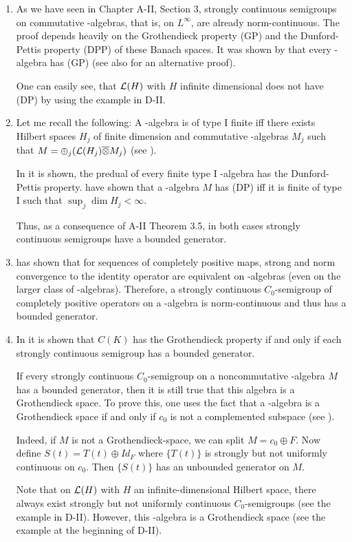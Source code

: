 \begin{enumerate}

\item 
As we have seen in Chapter A-II, Section 3, strongly continuous semigroups on commutative \WA-algebras, that is, on $L^{\infty}$, are already norm-continuous. 
The proof depends heavily on the Grothendieck property (GP) and the Dunford-Pettis property (DPP) of these Banach spaces. 
It was shown by  that every \WA-algebra has (GP) (see also  for an alternative proof).

One can easily see, that \eg $\mathcal{L}(H)$ with $H$ infinite dimensional does not have (DP) by using the example in D-II.

\item
Let me recall the following: A \WA-algebra is of type I finite iff there exists Hilbert spaces $H_{j}$ of finite dimension and commutative \WA-algebras $M_{j}$ such that 
$M = \oplus_{j} ( \mathcal{L}(H_{j}) \overline{\otimes} M_{j} ) $ (see ).

In  it is shown, the predual of every finite type I \WA-algebra has the Dunford-Pettis property.
 have shown that a \WA-algebra $M$ has (DP) iff it is finite of type I such that $ \sup_{j} \dim H_{j} < \infty$.

Thus, as a consequence of A-II Theorem 3.5, in both cases strongly continuous semigroups have a bounded generator.

\item
{} has shown that for sequences of completely positive maps, strong and norm convergence to the identity operator are equivalent on \WA-algebras (even on the larger class of \AW-algebras).
Therefore, a strongly continuous $C_{0}$-semigroup of completely positive operators on a \WA-algebra is norm-continuous and thus has a bounded generator.

\item 
In  it is shown that $C(K)$ has the Grothendieck property if and only if each strongly continuous semigroup has a bounded generator. 

If every strongly continuous $C_{0}$-semigroup on a noncommutative \CA-algebra $M$ has a bounded generator, then it is still true that this algebra is a Grothendieck space. 
To prove this, one uses the fact that a \CA-algebra is a Grothendieck space if and only if $c_{0}$ is not a complemented subspace (see 
).

Indeed, if $M$ is not a Grothendieck-space, we can split $M = c_{0} \oplus F$.
Now define $S(t) = T(t) \oplus Id_{F}$ where $\{T(t)\}$ is strongly but not uniformly continuous on $c_{0}$.
Then $\{S(t)\}$ has an unbounded generator on $M$.

Note that on $\mathcal{L}(H)$ with $H$ an infinite-dimensional Hilbert space, there always exist strongly but not uniformly continuous $C_{0}$-semigroups (see the example in D-II).
However, this \WA-algebra is a Grothendieck space (see the example at the beginning of D-II).
\end{enumerate}

